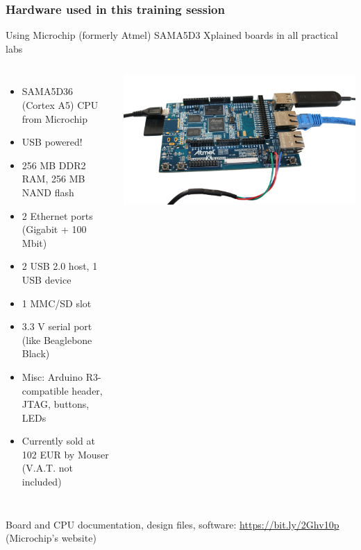\begin{frame}
\frametitle{Hardware used in this training session}
  Using Microchip (formerly Atmel) SAMA5D3 Xplained boards in all practical labs
  \begin{columns}
    {\footnotesize
    \begin{itemize}
	\item SAMA5D36 (Cortex A5) CPU from Microchip
	\item USB powered!
	\item 256 MB DDR2 RAM, 256 MB NAND flash
	\item 2 Ethernet ports (Gigabit + 100 Mbit)
	\item 2 USB 2.0 host, 1 USB device
	\item 1 MMC/SD slot
	\item 3.3 V serial port (like Beaglebone Black)
	\item Misc: Arduino R3-compatible header, JTAG, buttons, LEDs
	\item Currently sold at 102 EUR by Mouser (V.A.T. not included)
    \end{itemize}
    }
    \includegraphics[width=\textwidth]{slides/xplained-board/xplained-board.png}
  \end{columns}
  \vspace{1em}
  {\small
  Board and CPU documentation, design files, software:
  \url{https://bit.ly/2Ghv10p} (Microchip's website)
  }
\end{frame}
